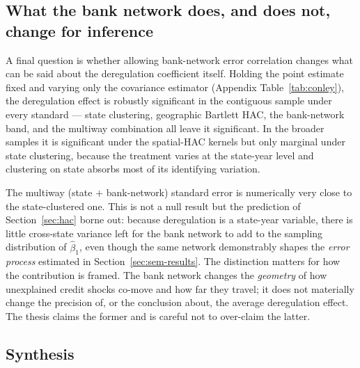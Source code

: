 \subsection{What the bank network does, and does not, change for inference}
\label{sec:inference-results}

A final question is whether allowing bank-network error correlation changes what
can be said about the deregulation coefficient itself. Holding the point estimate
fixed and varying only the covariance estimator (Appendix
Table~\ref{tab:conley}), the deregulation effect is robustly significant in the
contiguous sample under every standard --- state clustering, geographic Bartlett
HAC, the bank-network band, and the multiway combination all leave it significant.
In the broader samples it is significant under the spatial-HAC kernels but only
marginal under state clustering, because the treatment varies at the state-year
level and clustering on state absorbs most of its identifying variation.

The multiway (state $+$ bank-network) standard error is numerically very close to
the state-clustered one. This is not a null result but the prediction of
Section~\ref{sec:hac} borne out: because deregulation is a state-year variable,
there is little cross-state variance left for the bank network to add to the
sampling distribution of $\hat\beta_1$, even though the same network demonstrably
shapes the \emph{error process} estimated in Section~\ref{sec:sem-results}. The
distinction matters for how the contribution is framed. The bank network changes
the \emph{geometry} of how unexplained credit shocks co-move and how far they
travel; it does not materially change the precision of, or the conclusion about,
the average deregulation effect. The thesis claims the former and is careful not
to over-claim the latter.

\subsection{Synthesis}
\label{sec:synthesis}

